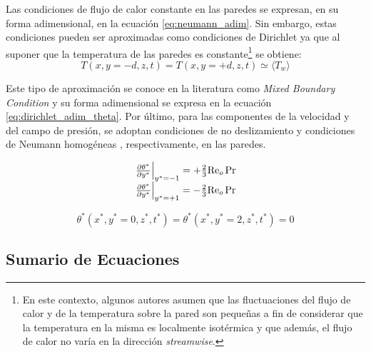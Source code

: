 Las condiciones de flujo de calor constante en las paredes se expresan, en su forma adimensional, en la ecuación \ref{eq:neumann_adim}. Sin embargo, estas condiciones pueden ser aproximadas como condiciones de Dirichlet ya que al suponer que la temperatura de las paredes es constante\footnote{En este contexto, algunos autores \cite{kasagi1992direct,tao1960} asumen que las fluctuaciones del flujo de calor y de la temperatura sobre la pared son pequeñas a fin de considerar que la temperatura en la misma es localmente isotérmica y que además, el flujo de calor no varía en la dirección \textit{streamwise}.} se obtiene:
$$T(x,y=-d,z,t) = T(x,y=+d,z,t) \simeq \langle T_w \rangle$$ 

Este tipo de aproximación se conoce en la literatura como \textit{Mixed Boundary Condition} \cite{straub2019influence} y su forma adimensional se expresa en la ecuación \ref{eq:dirichlet_adim_theta}. Por último, para las componentes de la velocidad y del campo de presión, se adoptan condiciones de no deslizamiento y condiciones de Neumann homogéneas \cite{bartholomew2020xcompact3d}, respectivamente, en las paredes. 

\begin{align}
\begin{array}{l}
    \left. \frac{\partial \theta^*}{\partial y^*} \right\vert_{y^*=-1} = + \frac{2}{3} \text{Re}_o \hspace{0.5mm} \text{Pr} \\
    \left. \frac{\partial \theta^*}{\partial y^*} \right\vert_{y^*=+1} = - \frac{2}{3} \text{Re}_o \hspace{0.5mm} \text{Pr} 
\end{array}
\label{eq:neumann_adim}
\end{align}

\begin{equation}
\theta^*(x^*,y^*=0,z^*,t^*) = \theta^*(x^*,y^*=2,z^*,t^*) = 0
\label{eq:dirichlet_adim_theta}
\end{equation}



\subsection{Sumario de Ecuaciones}

